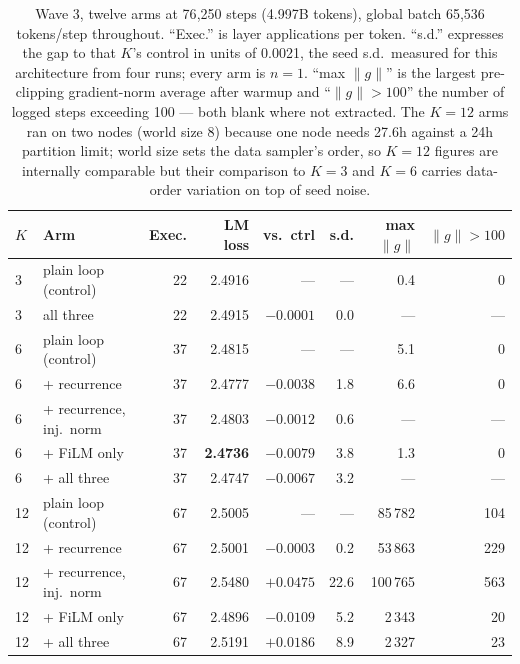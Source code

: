 \documentclass[11pt,a4paper]{article}
\begin{document}
\begin{table}[h]
\centering
\small
\begin{tabular}{llrrrrrr}
\toprule
$K$ & Arm & Exec. & LM loss & vs.\ ctrl & s.d. & max $\|g\|$ & $\|g\|{>}100$ \\
\midrule
3 & plain loop (control) & 22 & 2.4916 & --- & --- & 0.4 & 0 \\
3 & all three & 22 & 2.4915 & $-0.0001$ & 0.0 & --- & --- \\
\midrule
6 & plain loop (control) & 37 & 2.4815 & --- & --- & 5.1 & 0 \\
6 & \quad + recurrence & 37 & 2.4777 & $-0.0038$ & 1.8 & 6.6 & 0 \\
6 & \quad + recurrence, inj.\ norm & 37 & 2.4803 & $-0.0012$ & 0.6 & --- & --- \\
6 & \quad + FiLM only & 37 & \textbf{2.4736} & $-0.0079$ & 3.8 & 1.3 & 0 \\
6 & \quad + all three & 37 & 2.4747 & $-0.0067$ & 3.2 & --- & --- \\
\midrule
12 & plain loop (control) & 67 & 2.5005 & --- & --- & 85\,782 & 104 \\
12 & \quad + recurrence & 67 & 2.5001 & $-0.0003$ & 0.2 & 53\,863 & 229 \\
12 & \quad + recurrence, inj.\ norm & 67 & 2.5480 & $+0.0475$ & 22.6 & 100\,765 & 563 \\
12 & \quad + FiLM only & 67 & 2.4896 & $-0.0109$ & 5.2 & 2\,343 & 20 \\
12 & \quad + all three & 67 & 2.5191 & $+0.0186$ & 8.9 & 2\,327 & 23 \\
\bottomrule
\end{tabular}
\caption{Wave 3, twelve arms at 76{,}250 steps (4.997B tokens), global batch 65{,}536 tokens/step
throughout. ``Exec.'' is layer applications per token. ``s.d.'' expresses the gap to that $K$'s
control in units of 0.0021, the seed s.d.\ measured for this architecture from four runs; every arm
is $n=1$. ``max $\|g\|$'' is the largest pre-clipping gradient-norm average after warmup and
``$\|g\|{>}100$'' the number of logged steps exceeding 100 --- both blank where not extracted. The
$K{=}12$ arms ran on two nodes (world size 8) because one node needs 27.6h against a 24h partition
limit; world size sets the data sampler's order, so $K{=}12$ figures are internally comparable but
their comparison to $K{=}3$ and $K{=}6$ carries data-order variation on top of seed noise.}
\label{tab:wave3}
\end{table}
\end{document}
